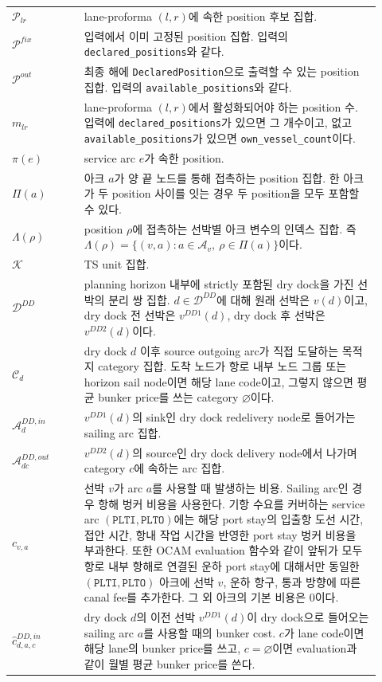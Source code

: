 \documentclass[11pt]{article}
\newcommand{\Arcs}{\mathcal{A}}
\newcommand{\TS}{\mathcal{K}}
\newcommand{\Positions}{\mathcal{P}}
\newcommand{\DD}{\mathcal{D}^{DD}}
\begin{document}
\begin{longtable}{@{}p{0.18\linewidth}p{0.74\linewidth}@{}}
$\Positions_{lr}$ & lane-proforma $(l,r)$에 속한 position 후보 집합. \\
$\Positions^{fix}$ & 입력에서 이미 고정된 position 집합. 입력의 \texttt{declared\_positions}와 같다. \\
$\Positions^{out}$ & 최종 해에 \texttt{DeclaredPosition}으로 출력할 수 있는 position 집합. 입력의 \texttt{available\_positions}와 같다. \\
$m_{lr}$ & lane-proforma $(l,r)$에서 활성화되어야 하는 position 수. 입력에 \texttt{declared\_positions}가 있으면 그 개수이고, 없고 \texttt{available\_positions}가 있으면 \texttt{own\_vessel\_count}이다. \\
$\pi(e)$ & service arc $e$가 속한 position. \\
$\Pi(a)$ & 아크 $a$가 양 끝 노드를 통해 접촉하는 position 집합. 한 아크가 두 position 사이를 잇는 경우 두 position을 모두 포함할 수 있다. \\
$\Lambda(\rho)$ & position $\rho$에 접촉하는 선박별 아크 변수의 인덱스 집합. 즉 $\Lambda(\rho)=\{(v,a):a\in\Arcs_v,\ \rho\in\Pi(a)\}$이다. \\
$\TS$ & TS unit 집합. \\
$\DD$ & planning horizon 내부에 strictly 포함된 dry dock을 가진 선박의 분리 쌍 집합. $d\in\DD$에 대해 원래 선박은 $v(d)$이고, dry dock 전 선박은 $v^{DD1}(d)$, dry dock 후 선박은 $v^{DD2}(d)$이다. \\
$\mathcal{C}_d$ & dry dock $d$ 이후 source outgoing arc가 직접 도달하는 목적지 category 집합. 도착 노드가 항로 내부 노드 그룹 또는 horizon sail node이면 해당 lane code이고, 그렇지 않으면 평균 bunker price를 쓰는 category $\varnothing$이다. \\
$\Arcs^{DD,in}_d$ & $v^{DD1}(d)$의 sink인 dry dock redelivery node로 들어가는 sailing arc 집합. \\
$\Arcs^{DD,out}_{dc}$ & $v^{DD2}(d)$의 source인 dry dock delivery node에서 나가며 category $c$에 속하는 arc 집합. \\
$c_{v,a}$ & 선박 $v$가 arc $a$를 사용할 때 발생하는 비용. Sailing arc인 경우 항해 벙커 비용을 사용한다. 기항 수요를 커버하는 service arc $(\texttt{PLTI},\texttt{PLTO})$에는 해당 port stay의 입출항 도선 시간, 접안 시간, 항내 작업 시간을 반영한 port stay 벙커 비용을 부과한다. 또한 OCAM evaluation 함수와 같이 앞뒤가 모두 항로 내부 항해로 연결된 운하 port stay에 대해서만 동일한 $(\texttt{PLTI},\texttt{PLTO})$ 아크에 선박 $v$, 운하 항구, 통과 방향에 따른 canal fee를 추가한다. 그 외 아크의 기본 비용은 0이다.\\
$\hat c^{DD,in}_{d,a,c}$ & dry dock $d$의 이전 선박 $v^{DD1}(d)$이 dry dock으로 들어오는 sailing arc $a$를 사용할 때의 bunker cost. $c$가 lane code이면 해당 lane의 bunker price를 쓰고, $c=\varnothing$이면 evaluation과 같이 월별 평균 bunker price를 쓴다. \\

\end{longtable}
\end{document}
